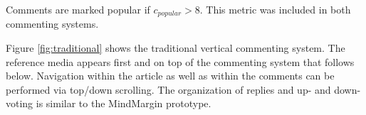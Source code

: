 Comments are marked popular if $c_{popular} > 8$. This metric was included in both commenting systems.
   
   
Figure \ref{fig:traditional} shows the traditional vertical commenting system. The reference media appears first and on top of the commenting system that follows below. Navigation within the article as well as within the comments can be performed via top/down scrolling. The organization of replies and up- and down-voting is similar to the MindMargin prototype.


